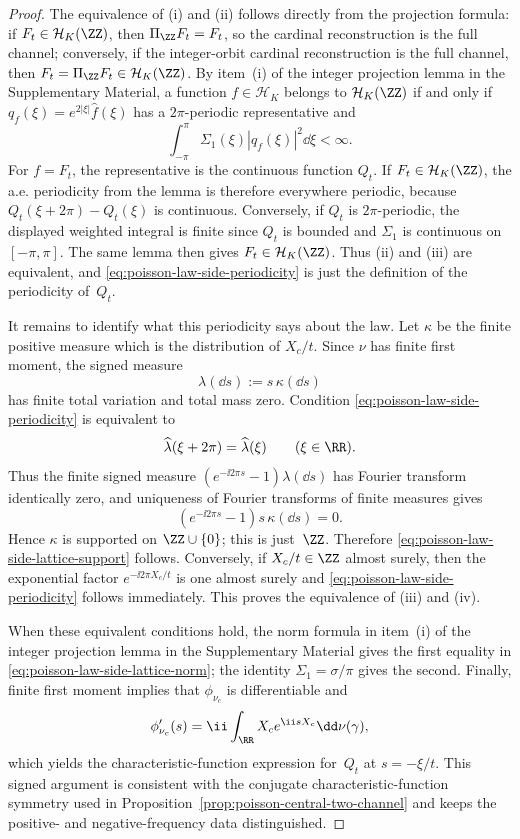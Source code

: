 \begin{proof}
The equivalence of (i) and (ii) follows directly from the projection formula:
if $F_t\in\mathcal H_K(\ZZ)$, then $\Pi_{\ZZ}F_t=F_t$, so the cardinal
reconstruction is the full channel; conversely, if the integer-orbit cardinal
reconstruction is the full channel, then
$F_t=\Pi_{\ZZ}F_t\in\mathcal H_K(\ZZ)$.  By item~(i) of the integer
projection lemma in the Supplementary Material, a function
$f\in\mathcal H_K$ belongs to $\mathcal H_K(\ZZ)$ if and only if
$q_f(\xi)=e^{2|\xi|}\widehat f(\xi)$ has a $2\pi$-periodic representative
and
\[
\int_{-\pi}^{\pi}\Sigma_1(\xi)|q_f(\xi)|^2\dd\xi<\infty .
\]
For $f=F_t$, the representative is the continuous function $Q_t$.  If
$F_t\in\mathcal H_K(\ZZ)$, the a.e. periodicity from the lemma is therefore
everywhere periodic, because $Q_t(\xi+2\pi)-Q_t(\xi)$ is continuous.  Conversely,
if $Q_t$ is $2\pi$-periodic, the displayed weighted integral is finite since
$Q_t$ is bounded and $\Sigma_1$ is continuous on $[-\pi,\pi]$.  The same lemma
then gives $F_t\in\mathcal H_K(\ZZ)$.  Thus (ii) and (iii) are equivalent, and
\eqref{eq:poisson-law-side-periodicity} is just the definition of the
periodicity of~$Q_t$.

It remains to identify what this periodicity says about the law.  Let
$\kappa$ be the finite positive measure which is the distribution of
$X_c/t$.  Since $\nu$ has finite first moment, the signed measure
\[
\lambda(\dd s):=s\,\kappa(\dd s)
\]
has finite total variation and total mass zero.  Condition
\eqref{eq:poisson-law-side-periodicity} is equivalent to
\[
\widehat\lambda(\xi+2\pi)=\widehat\lambda(\xi)
\qquad(\xi\in\RR).
\]
Thus the finite signed measure $(e^{-\ii2\pi s}-1)\lambda(\dd s)$ has
Fourier transform identically zero, and uniqueness of Fourier transforms of
finite measures gives
\[
(e^{-\ii2\pi s}-1)s\,\kappa(\dd s)=0.
\]
Hence $\kappa$ is supported on $\ZZ\cup\{0\}$; this is just~$\ZZ$.  Therefore
\eqref{eq:poisson-law-side-lattice-support} follows.  Conversely, if
$X_c/t\in\ZZ$ almost surely, then the exponential factor
$e^{-\ii2\pi X_c/t}$ is one almost surely and
\eqref{eq:poisson-law-side-periodicity} follows immediately.  This proves the
equivalence of (iii) and (iv).

When these equivalent conditions hold, the norm formula in item~(i) of the
integer projection lemma in the Supplementary Material gives the first equality
in \eqref{eq:poisson-law-side-lattice-norm}; the identity
$\Sigma_1=\sigma/\pi$ gives the second.  Finally, finite first moment implies
that $\phi_{\nu_c}$ is differentiable and
\[
\phi_{\nu_c}'(s)=\ii\int_{\RR}X_c e^{\ii sX_c}\dd\nu(\gamma),
\]
which yields the characteristic-function expression for~$Q_t$ at
$s=-\xi/t$.  This signed argument is consistent with the conjugate
characteristic-function symmetry used in
Proposition~\ref{prop:poisson-central-two-channel} and keeps the
positive- and negative-frequency data distinguished.
\end{proof}
